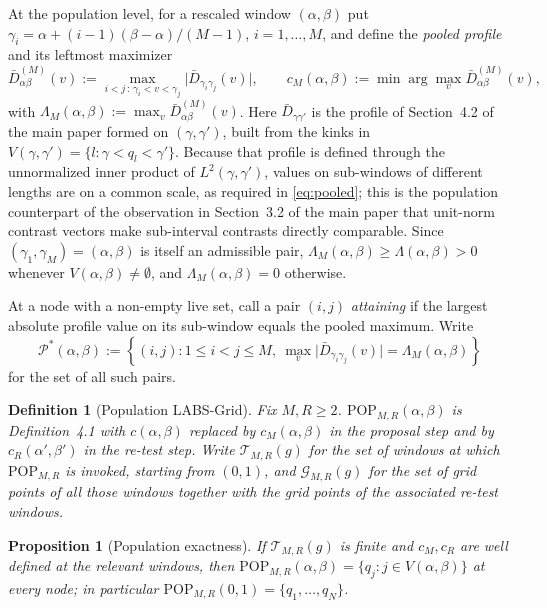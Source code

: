\documentclass[12pt, a4paper]{article}
\newtheorem{prop}{Proposition}[section]
\newtheorem{defin}{Definition}[section]
\newcommand{\defpop}{Definition~4.1}
\begin{document}
At the population level, for a rescaled window $(\alpha,\beta)$ put
$\gamma_i = \alpha + (i-1)(\beta-\alpha)/(M-1)$, $i = 1,\ldots,M$, and define
the \emph{pooled profile} and its leftmost maximizer
\begin{equation}
\label{eq:pooled}
\bar D^{(M)}_{\alpha\beta}(v) := \max_{i<j \, : \, \gamma_i < v < \gamma_j}
\big| \bar D_{\gamma_i\gamma_j}(v) \big| ,
\qquad
c_M(\alpha,\beta) := \min \arg\max_v \bar D^{(M)}_{\alpha\beta}(v),
\end{equation}
with $\Lambda_M(\alpha,\beta) := \max_v \bar D^{(M)}_{\alpha\beta}(v)$. Here
$\bar D_{\gamma\gamma'}$ is the profile of Section~4.2 of the main paper formed
on $(\gamma,\gamma')$, built from the kinks in $V(\gamma,\gamma') =
\{l : \gamma < q_l < \gamma'\}$. Because that profile is defined through the
unnormalized inner product of $L^2(\gamma,\gamma')$, values on sub-windows of
different lengths are on a common scale, as required in \eqref{eq:pooled}; this
is the population counterpart of the observation in Section~3.2 of the main
paper that unit-norm contrast vectors make sub-interval contrasts directly
comparable. Since $(\gamma_1,\gamma_M) = (\alpha,\beta)$ is itself an
admissible pair, $\Lambda_M(\alpha,\beta) \ge \Lambda(\alpha,\beta) > 0$
whenever $V(\alpha,\beta) \ne \emptyset$, and
$\Lambda_M(\alpha,\beta) = 0$ otherwise.

At a node with a non-empty live set, call a pair $(i,j)$ \emph{attaining} if
the largest absolute profile value on its sub-window equals the pooled
maximum. Write
\[
\mathcal{P}^*(\alpha,\beta)
:= \left\{(i,j):1\le i<j\le M,\ 
\max_v\big|\bar D_{\gamma_i\gamma_j}(v)\big|
=\Lambda_M(\alpha,\beta)\right\}
\]
for the set of all such pairs.

\begin{defin}[Population LABS-Grid]
\label{def:gpop}
Fix $M, R \ge 2$. $\mathrm{POP}_{M,R}(\alpha,\beta)$ is
\defpop{} with $c(\alpha,\beta)$ replaced by $c_M(\alpha,\beta)$ in the
proposal step and by $c_R(\alpha',\beta')$ in the re-test step. Write
$\mathcal{T}_{M,R}(g)$ for the set of windows at which $\mathrm{POP}_{M,R}$ is
invoked, starting from $(0,1)$, and $\mathcal{G}_{M,R}(g)$ for the set of grid
points of all those windows together with the grid points of the associated
re-test windows.
\end{defin}

\begin{prop}[Population exactness]
\label{prop:gpopexact}
If $\mathcal{T}_{M,R}(g)$ is finite and $c_M, c_R$ are well defined at the
relevant windows, then $\mathrm{POP}_{M,R}(\alpha,\beta) = \{q_j : j \in
V(\alpha,\beta)\}$ at every node; in particular
$\mathrm{POP}_{M,R}(0,1) = \{q_1,\ldots,q_N\}$.
\end{prop}
\end{document}
